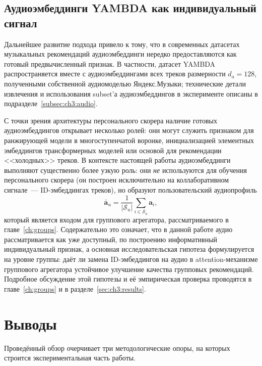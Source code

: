 \subsection{Аудиоэмбеддинги YAMBDA как индивидуальный сигнал}
\label{subsec:ch1:yambda-audio}

Дальнейшее развитие подхода привело к тому, что в современных датасетах музыкальных рекомендаций аудиоэмбеддинги нередко предоставляются как готовый предвычисленный признак. В частности, датасет YAMBDA~\cite{yambda2025} распространяется вместе с аудиоэмбеддингами всех треков размерности $d_a = 128$, полученными собственной аудиомоделью Яндекс.Музыки; технические детали извлечения и использования subset'а аудиоэмбеддингов в эксперименте описаны в подразделе~\ref{subsec:ch3:audio}.

С точки зрения архитектуры персонального скорера наличие готовых аудиоэмбеддингов открывает несколько ролей: они могут служить признаком для ранжирующей модели в многоступенчатой воронке, инициализацией элементных эмбеддингов трансформерных моделей или основой для рекомендации <<холодных>> треков. В контексте настоящей работы аудиоэмбеддинги выполняют существенно более узкую роль: они \emph{не} используются для обучения персонального скорера (он построен исключительно на коллаборативном сигнале~--- ID-эмбеддингах треков), но образуют пользовательский аудиопрофиль
\begin{equation}
    \bar{\mathbf{a}}_u = \frac{1}{|\mathcal{S}_u|} \sum_{i \in \mathcal{S}_u} \mathbf{a}_i,
    \label{eq:user-audio-profile}
\end{equation}
который является входом для группового агрегатора, рассматриваемого в главе~\ref{ch:groups}. Содержательно это означает, что в данной работе аудио рассматривается как уже доступный, по построению информативный индивидуальный признак, а основная исследовательская гипотеза формулируется на уровне группы: даёт ли замена ID-эмбеддингов на аудио в attention-механизме группового агрегатора устойчивое улучшение качества групповых рекомендаций. Подробное обсуждение этой гипотезы и её эмпирическая проверка проводятся в главе~\ref{ch:groups} и в разделе~\ref{sec:ch3:results}.

\section{Выводы}
\label{sec:ch1:conclusion}

Проведённый обзор очерчивает три методологические опоры, на которых строится экспериментальная часть работы.

